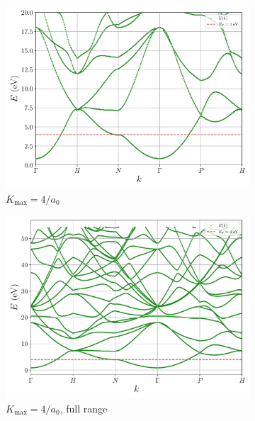 \documentclass[a4paper,DIV=12,english]{scrartcl}
\begin{document}
\begin{figure}
\begin{subfigure}{0.49\textwidth}
        \centering 
        \includegraphics[width=\textwidth]{../plots/bs_4_R_130.pdf}
        \caption{$K_\text{max} = 4/a_0$}
        \label{subfig:bs_4_130}
    \end{subfigure}
    \begin{subfigure}{0.49\textwidth}
        \centering 
        \includegraphics[width=\textwidth]{../plots/bs_4_R_130_full.pdf}
        \caption{$K_\text{max} = 4/a_0$, full range}
        \label{subfig:bs_4_130_full}
    \end{subfigure}
    \begin{subfigure}{0.49\textwidth}
        \centering 

\end{subfigure}
\end{figure}
\end{document}
